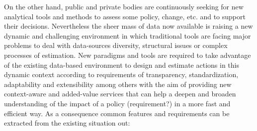 On the other hand, public and private bodies are continuously seeking for new analytical tools and methods to assess some policy, change, etc. and 
to support their decisions. Nevertheless the sheer mass of data now available is raising a new dynamic and challenging environment 
in which traditional tools are facing major problems to deal with data-sources diversity, structural issues or complex processes of estimation.
New paradigms and tools are required to take advantage of the existing data-based environment to design and estimate actions 
in this dynamic context according to requirements of transparency, standardization, adaptability and extensibility among others with the aim of providing new context-aware 
and added-value services that can help a deepen and broaden understanding of the impact of a policy (requirement?) in a more fast and efficient way. 
As a consequence common features and requirements can be extracted from the existing situation out:
